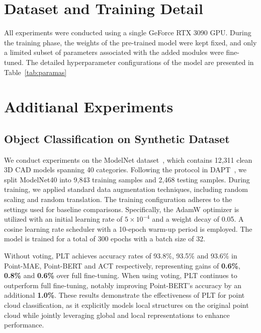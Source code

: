 \setcounter{page}{1}

\section{Dataset and Training Detail}

All experiments were conducted using a single GeForce RTX 3090 GPU. During the training phase, the weights of the pre-trained model were kept fixed, and only a limited subset of parameters associated with the added modules were fine-tuned. The detailed hyperparameter configurations of the model are presented in Table~\ref{tab:paramas}




\section{Additianal Experiments}

\subsection{Object Classification on Synthetic Dataset}
We conduct experiments on the ModelNet dataset~\cite{wu20153d}, which contains 12,311 clean 3D CAD models spanning 40 categories. Following the protocol in DAPT~\cite{zhou2024dynamic}, we split ModelNet40 into 9,843 training samples and 2,468 testing samples. During training, we applied standard data augmentation techniques, including random scaling and random translation. The training configuration adheres to the settings used for baseline comparisons. Specifically, the AdamW optimizer is utilized with an initial learning rate of $5 \times 10^{-4}$ and a weight decay of 0.05. A cosine learning rate scheduler with a 10-epoch warm-up period is employed. The model is trained for a total of 300 epochs with a batch size of 32. 

Without voting, PLT achieves accuracy rates of 93.8\%, 93.5\% and 93.6\% in Point-MAE, Point-BERT and ACT respectively, representing gains of \textbf{0.6\%}, \textbf{0.8\%} and \textbf{0.6\%} over full fine-tuning. When using voting, PLT continues to outperform full fine-tuning, notably improving Point-BERT's accuracy by an additional \textbf{1.0\%}. These results demonstrate the effectiveness of PLT for point cloud classification, as it explicitly models local structures on the original point cloud while jointly leveraging global and local representations to enhance performance.

